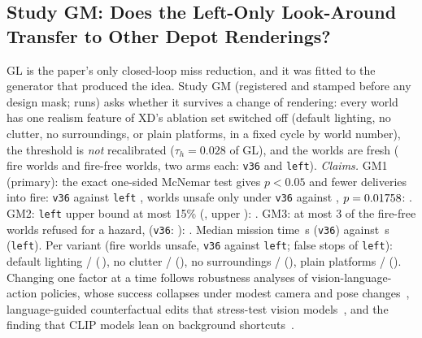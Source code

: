 \subsection{Study GM: Does the Left-Only Look-Around Transfer to Other Depot Renderings?}\label{sec:moved-gm}
GL is the paper's only closed-loop miss reduction, and it was fitted to the generator that produced the idea. Study GM (registered and stamped before any design mask; \GMTrials{} runs) asks whether it survives a change of rendering: every world has one realism feature of XD's ablation set switched off (default lighting, no clutter, no surroundings, or plain platforms, in a fixed cycle by world number), the threshold is \emph{not} recalibrated ($\tau_h=0.028$ of GL), and the worlds are fresh (\GMWorlds{} fire worlds and \GMPlain{} fire-free worlds, two arms each: \texttt{v36} and \texttt{left}).
\emph{Claims.} GM1 (primary): the exact one-sided McNemar test gives $p<0.05$ and fewer deliveries into fire: \texttt{v36} \GMV{} against \texttt{left} \GMLeft{}, \GMOnlyV{} worlds unsafe only under \texttt{v36} against \GMOnlyLeft{}, $p=0.01758$: \GMOneHolds. GM2: \texttt{left} upper bound at most 15\% (\GMLeftRate, upper \GMLeftUpper): \GMTwoHolds. GM3: at most 3 of the fire-free worlds refused for a hazard, \GMFalseStops{} (\texttt{v36}: \GMFalseStopsV): \GMThreeHolds. Median mission time \GMTimeV\,s (\texttt{v36}) against \GMTimeLeft\,s (\texttt{left}). Per variant (fire worlds unsafe, \texttt{v36} against \texttt{left}; false stops of \texttt{left}): default lighting \GMLightV{} / \GMLightLeft{} ($\,$\GMLightFS), no clutter \GMClutterV{} / \GMClutterLeft{} (\GMClutterFS), no surroundings \GMSurrV{} / \GMSurrLeft{} (\GMSurrFS), plain platforms \GMPlatV{} / \GMPlatLeft{} (\GMPlatFS).
Changing one factor at a time follows robustness analyses of vision-language-action policies, whose success collapses under modest camera and pose changes~\cite{fei2025liberoplus}, language-guided counterfactual edits that stress-test vision models~\cite{prabhu2023lance}, and the finding that CLIP models lean on background shortcuts~\cite{wang2024counteranimal}.
